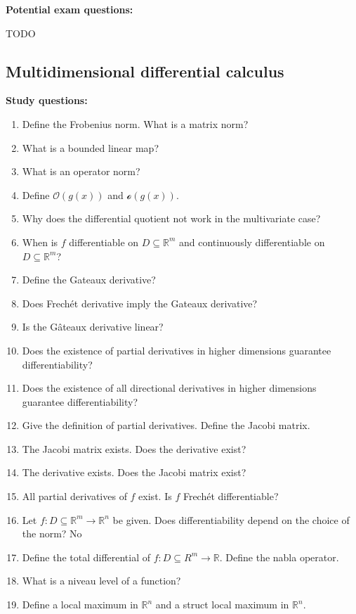 \documentclass{article}
\begin{document}
\textbf{Potential exam questions:}

TODO

\subsection{Multidimensional differential calculus}

\textbf{Study questions:}

\begin{enumerate}
  \item Define the Frobenius norm. What is a matrix norm?
  \item What is a bounded linear map?
  \item What is an operator norm?
  \item Define $\mathcal{O}(g(x))$ and $\mathcal{o}(g(x))$.
  \item Why does the differential quotient not work in the multivariate case?
  \item When is $f$ differentiable on $D \subseteq \mathbb R^m$ and continuously differentiable on $D \subseteq \mathbb R^m$?
  \item Define the Gateaux derivative?
  \item Does Frech\'et derivative imply the Gateaux derivative? %
  \item Is the Gâteaux derivative linear? %
  \item Does the existence of partial derivatives in higher dimensions guarantee differentiability? %
  \item Does the existence of all directional derivatives in higher dimensions guarantee differentiability? %
  \item Give the definition of partial derivatives. Define the Jacobi matrix.
  \item The Jacobi matrix exists. Does the derivative exist? %
  \item The derivative exists. Does the Jacobi matrix exist? %
  \item All partial derivatives of $f$ exist. Is $f$ Frech\'et differentiable? %
  \item Let $f: D \subseteq \mathbb R^m \to \mathbb R^n$ be given. Does differentiability depend on the choice of the norm? No
  \item Define the total differential of $f: D \subseteq R^m \to \mathbb R$. Define the nabla operator.
  \item What is a niveau level of a function?
  \item Define a local maximum in $\mathbb R^n$ and a struct local maximum in $\mathbb R^n$.

\end{enumerate}
\end{document}
